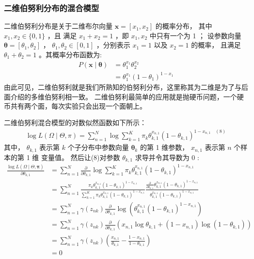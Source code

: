 \documentclass[UTF8]{ctexart}
\begin{document}
\subsubsection{二维伯努利分布的混合模型}
二维伯努利分布是关于二维布尔向量 $\boldsymbol{x}=\left[x_{1}, x_{2}\right]$ 的概率分布，
其中 $x_{1}, x_{2} \in\{0,1\}$ ，且 
满足 $x_{1}+x_{2}=1$ ，即 $x_{1}, x_{2}$ 中只有一个为 1 ；
设参数向量 $\boldsymbol{\theta}=\left[\theta_{1}, \theta_{2}\right]$ ，
$\theta_{1}, \theta_{2} \in[0,1]$ ，分别表示 $x_{1}=1$ 以及 $x_{2}=1$ 的概率，
且满足 $\theta_{1}+\theta_{2}=1$ 。其概率分布函数为:
$$
\begin{aligned}
P(\boldsymbol{x} \mid \boldsymbol{\theta}) &=\theta_{1}^{x_{1}} \theta_{2}^{x_{2}} \\
&=\theta_{1}^{x_{1}}\left(1-\theta_{1}\right)^{1-x_{1}}
\end{aligned}
$$
由此可见，二维伯努利就是我们所熟知的伯努利分布，这里称其为二维是为了与后面介绍的多维伯努利相一致。
二维伯努利最简单的应用就是抛硬币问题，一个硬币共有两个面，每次实验只会出现一个面朝上。

二维伯努利混合模型的对数似然函数如下所示：
$$
\begin{aligned}
\log L(\Omega \mid \Theta, \pi)=\sum_{n=1}^{N} \log \sum_{k=1}^{K} \pi_{k} \theta_{k, 1}^{x_{n, 1}}\left(1-\theta_{k, 1}\right)^{1-x_{n, 1} \quad(8)}
\end{aligned}
$$
其中， $\theta_{k, 1}$ 表示第 $k$ 个子分布中参数向量 $\boldsymbol{\theta}_{k}$ 的第 1 维参数， $x_{n, 1}$ 表示第 $n$ 个样本的第 1 维 变量值。
然后让(8)对参数 $\theta_{k, 1}$ 求导并令其导数为 0 :
$$
\begin{aligned}
\frac{\log L(\Omega \mid \Theta, \boldsymbol{\pi})}{\partial \theta_{k, 1}}
&=\sum_{n=1}^{N} \frac{\partial}{\partial \theta_{k, 1}} \log \sum_{k=1}^{K} \pi_{k} \theta_{k, 1}^{x_{n, 1}}\left(1-\theta_{k, 1}\right)^{1-x_{n, 1}}\\
&=\sum_{n=1}^{N} \frac{\pi_{k} \theta_{k, 1}^{x_{n, 1}}\left(1-\theta_{k, 1}\right)^{1-x_{n, 1}}}{\sum_{k=1}^{K} \pi_{k} \theta_{k, 1}^{x_{n, 1}}\left(1-\theta_{k, 1}\right)^{1-x_{n, 1}}} \frac{\frac{\partial}{\partial \theta_{k, 1}} \theta_{k, 1}^{x_{n, 1}}\left(1-\theta_{k, 1}\right)^{1-x_{n, 1}}}{\theta_{k, 1}^{x_{n, 1}}\left(1-\theta_{k, 1}\right)^{1-x_{n, 1}}}\\
&=\sum_{n=1}^{N} \gamma\left(z_{n k}\right) \frac{\partial}{\partial \theta_{k, 1}} \log \left(\theta_{k, 1}^{x_{n, 1}}\left(1-\theta_{k, 1}\right)^{1-x_{n, 1}}\right)\\
&=\sum_{n=1}^{N} \gamma\left(z_{n k}\right) \frac{\partial}{\partial \theta_{k, 1}}\left(x_{n, 1} \log \theta_{k, 1}+\left(1-x_{n, 1}\right) \log \left(1-\theta_{k, 1}\right)\right)\\
&=\sum_{n=1}^{N} \gamma\left(z_{n k}\right)\left(\frac{x_{n, 1}}{\theta_{k, 1}}-\frac{1-x_{n, 1}}{1-\theta_{k, 1}}\right)\\
&=0
\end{aligned}
$$
\end{document}
